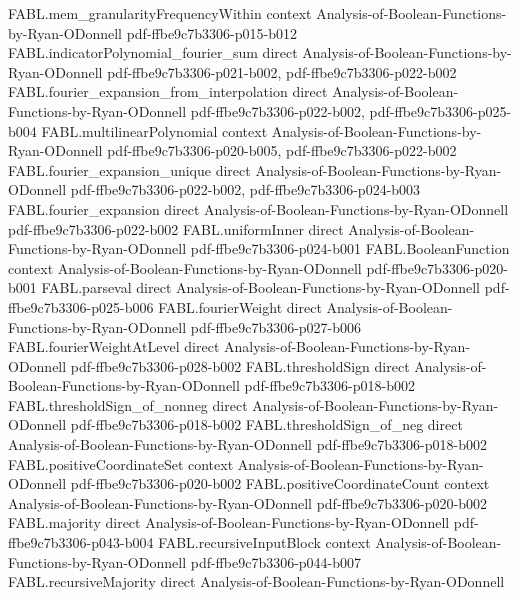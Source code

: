 \begin{theorem}
\proofstep
  {FABL.mem_granularityFrequencyWithin}
  {context}
  {Analysis-of-Boolean-Functions-by-Ryan-ODonnell}
  {pdf-ffbe9c7b3306-p015-b012}
\proofstep
  {FABL.indicatorPolynomial_fourier_sum}
  {direct}
  {Analysis-of-Boolean-Functions-by-Ryan-ODonnell}
  {pdf-ffbe9c7b3306-p021-b002,
    pdf-ffbe9c7b3306-p022-b002}
\proofstep
  {FABL.fourier_expansion_from_interpolation}
  {direct}
  {Analysis-of-Boolean-Functions-by-Ryan-ODonnell}
  {pdf-ffbe9c7b3306-p022-b002,
    pdf-ffbe9c7b3306-p025-b004}
\proofstep
  {FABL.multilinearPolynomial}
  {context}
  {Analysis-of-Boolean-Functions-by-Ryan-ODonnell}
  {pdf-ffbe9c7b3306-p020-b005,
    pdf-ffbe9c7b3306-p022-b002}
\proofstep
  {FABL.fourier_expansion_unique}
  {direct}
  {Analysis-of-Boolean-Functions-by-Ryan-ODonnell}
  {pdf-ffbe9c7b3306-p022-b002,
    pdf-ffbe9c7b3306-p024-b003}
\proofstep
  {FABL.fourier_expansion}
  {direct}
  {Analysis-of-Boolean-Functions-by-Ryan-ODonnell}
  {pdf-ffbe9c7b3306-p022-b002}
\proofstep
  {FABL.uniformInner}
  {direct}
  {Analysis-of-Boolean-Functions-by-Ryan-ODonnell}
  {pdf-ffbe9c7b3306-p024-b001}
\proofstep
  {FABL.BooleanFunction}
  {context}
  {Analysis-of-Boolean-Functions-by-Ryan-ODonnell}
  {pdf-ffbe9c7b3306-p020-b001}
\proofstep
  {FABL.parseval}
  {direct}
  {Analysis-of-Boolean-Functions-by-Ryan-ODonnell}
  {pdf-ffbe9c7b3306-p025-b006}
\proofstep
  {FABL.fourierWeight}
  {direct}
  {Analysis-of-Boolean-Functions-by-Ryan-ODonnell}
  {pdf-ffbe9c7b3306-p027-b006}
\proofstep
  {FABL.fourierWeightAtLevel}
  {direct}
  {Analysis-of-Boolean-Functions-by-Ryan-ODonnell}
  {pdf-ffbe9c7b3306-p028-b002}
\proofstep
  {FABL.thresholdSign}
  {direct}
  {Analysis-of-Boolean-Functions-by-Ryan-ODonnell}
  {pdf-ffbe9c7b3306-p018-b002}
\proofstep
  {FABL.thresholdSign_of_nonneg}
  {direct}
  {Analysis-of-Boolean-Functions-by-Ryan-ODonnell}
  {pdf-ffbe9c7b3306-p018-b002}
\proofstep
  {FABL.thresholdSign_of_neg}
  {direct}
  {Analysis-of-Boolean-Functions-by-Ryan-ODonnell}
  {pdf-ffbe9c7b3306-p018-b002}
\proofstep
  {FABL.positiveCoordinateSet}
  {context}
  {Analysis-of-Boolean-Functions-by-Ryan-ODonnell}
  {pdf-ffbe9c7b3306-p020-b002}
\proofstep
  {FABL.positiveCoordinateCount}
  {context}
  {Analysis-of-Boolean-Functions-by-Ryan-ODonnell}
  {pdf-ffbe9c7b3306-p020-b002}
\proofstep
  {FABL.majority}
  {direct}
  {Analysis-of-Boolean-Functions-by-Ryan-ODonnell}
  {pdf-ffbe9c7b3306-p043-b004}
\proofstep
  {FABL.recursiveInputBlock}
  {context}
  {Analysis-of-Boolean-Functions-by-Ryan-ODonnell}
  {pdf-ffbe9c7b3306-p044-b007}
\proofstep
  {FABL.recursiveMajority}
  {direct}
  {Analysis-of-Boolean-Functions-by-Ryan-ODonnell}

\end{theorem}
